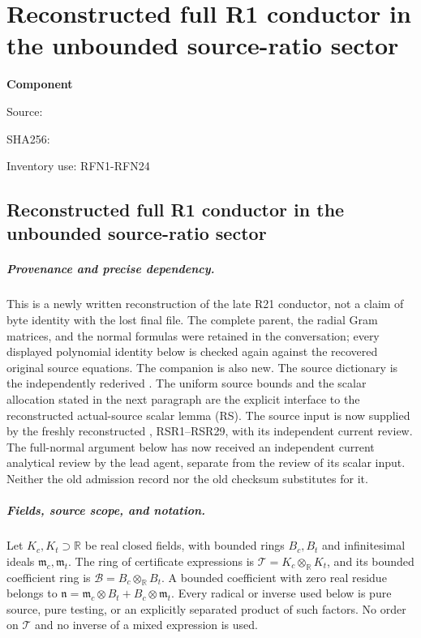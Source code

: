 \chapter{Reconstructed full R1 conductor in the unbounded source-ratio sector}
\label{component:p261f71af685d}
\noindent\textbf{Component }\par
{\small\noindent Source: \par}
{\small\noindent SHA256: \par}
{\small\noindent Inventory use: RFN1-RFN24\par}
\medskip
\section{Reconstructed full R1 conductor in the unbounded source-ratio sector}
\label{p261f71af685d:sec:fn-reconstructed}

\paragraph{Provenance and precise dependency.}
This is a newly written reconstruction of the late R21 conductor, not a
claim of byte identity with the lost final file.  The complete parent,
the radial Gram matrices, and the normal formulas were retained in the
conversation; every displayed polynomial identity below is checked
again against the recovered original source equations.  The companion
 is also new.  The source dictionary
is the independently rederived
.
The uniform source bounds and the scalar allocation stated in the next
paragraph are the explicit interface to the reconstructed actual-source
scalar lemma (RS).  The source input is now supplied by the freshly reconstructed
,
RSR1--RSR29, with its independent current review.  The full-normal
argument below has now received an independent current analytical review
by the lead agent, separate from the review of its scalar input.  Neither
the old admission record nor the old checksum substitutes for it.

\paragraph{Fields, source scope, and notation.}
Let $K_c,K_t\supset\mathbb R$ be real closed fields, with bounded rings
$B_c,B_t$ and infinitesimal ideals $\mathfrak m_c,\mathfrak m_t$.
The ring of certificate expressions is
$\mathcal T=K_c\otimes_{\mathbb R}K_t$, and its bounded coefficient ring
is $\mathcal B=B_c\otimes_{\mathbb R}B_t$.  A bounded coefficient with
zero real residue belongs to
$\mathfrak n=\mathfrak m_c\otimes B_t+B_c\otimes\mathfrak m_t$.
Every radical or inverse used below is pure source, pure testing, or
an explicitly separated product of such factors.  No order on
$\mathcal T$ and no inverse of a mixed expression is used.

